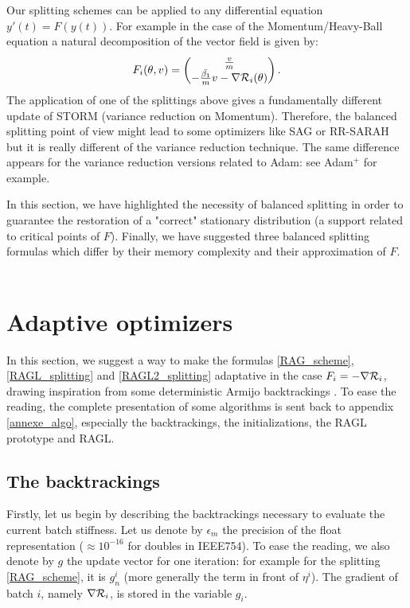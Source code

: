 \begin{remark}
	Our splitting schemes can be applied to any differential equation $y'(t)=F(y(t))$. For example in the case of the Momentum/Heavy-Ball equation \cite{momentum_sutskever_RNN,Polyak,polyak_momentum_stability,continuous_general} a natural decomposition of the vector field is given by:
	\begin{equation*}
		F_i(\theta,v) = 
		\begin{pmatrix}
			\frac{v}{m} \\
			-\frac{\bar{\beta_1}}{m} v-\nabla \mathcal{R}_i(\theta)
		\end{pmatrix}.
	\end{equation*}
	The application of one of the splittings above gives a fundamentally different update of STORM (variance reduction on Momentum). Therefore, the balanced splitting point of view might lead to some optimizers like SAG or RR-SARAH but it is really different of the variance reduction technique. The same difference appears for the variance reduction versions related to Adam: see Adam$^+$ \cite{adam_variance1} for example.
\end{remark}

In this section, we have highlighted the necessity of balanced splitting in order to guarantee the restoration of a "correct" stationary distribution (a support related to critical
points of $F$). Finally, we have suggested three balanced splitting formulas which differ by their memory complexity and their approximation of $F$. \\ \ \\


\section{Adaptive optimizers}
\label{section_optimizers}

In this section, we suggest a way to make the formulas \eqref{RAG_scheme}, \eqref{RAGL_splitting} and \eqref{RAGL2_splitting} adaptative in the case $F_i=-\nabla \mathcal{R}_i$, drawing inspiration from some deterministic Armijo backtrackings \cite{armijo,Rondepierre,Lyap_Theory_Bilel,Bilel_thesis}. To ease the reading, the complete presentation of some algorithms is sent back to appendix \ref{annexe_algo}, especially the backtrackings, the initializations, the RAGL prototype and RAGL.

\subsection{The backtrackings}
Firstly, let us begin by describing the backtrackings necessary to evaluate the current batch stiffness. Let us denote by $\epsilon_m$ the precision of the float representation
($\approx 10^{-16}$ for doubles in IEEE754). To ease the reading, we also denote by $g$ the update vector for one iteration: for example for the splitting \eqref{RAG_scheme}, it is $g_n^i$ (more generally the term in front of $\eta^i$). The gradient of batch $i$, namely $\nabla \mathcal{R}_i$, is stored in the variable $g_i$. 

